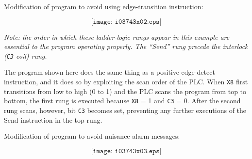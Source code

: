 \vskip 10pt

Modification of program to avoid using edge-transition instruction:

$$\texttt{[image: i03743x02.eps]}$$

{\it Note: the order in which these ladder-logic rungs appear in this example are essential to the program operating properly.  The ``Send'' rung  precede the interlock ({\tt C3} coil) rung.}

\vskip 10pt

The program shown here does the same thing as a positive edge-detect instruction, and it does so by exploiting the scan order of the PLC.  When {\tt X8} first transitions from low to high (0 to 1) and the PLC scans the program from top to bottom, the first rung is executed because {\tt X8} = 1 and {\tt C3} = 0.  After the second rung scans, however, bit {\tt C3} becomes set, preventing any further executions of the Send instruction in the top rung.

\vskip 10pt

\filbreak

Modification of program to avoid nuisance alarm messages:

$$\texttt{[image: i03743x03.eps]}$$











